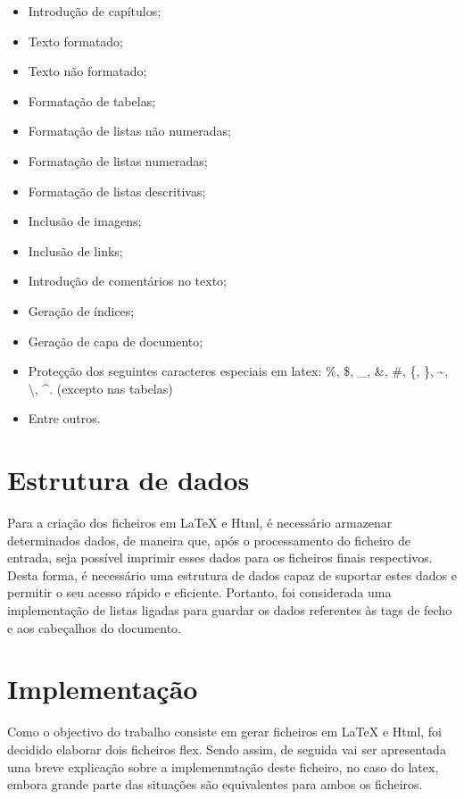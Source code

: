 \documentclass[11pt,a4paper]{article}
\begin{document}
\begin{itemize}
    \item Introdução de capítulos;
    \item Texto formatado;
    \item Texto não formatado;
    \item Formatação de tabelas;
    \item Formatação de listas não numeradas;
    \item Formatação de listas numeradas;
    \item Formatação de listas descritivas;
    \item Inclusão de imagens;
    \item Inclusão de links;
    \item Introdução de comentários no texto;
    \item Geração de índices;
    \item Geração de capa de documento;
    \item Proteçção dos seguintes caracteres especiais em latex: \%, \$, \_, \&, \#, \{, \}, \textasciitilde , \textbackslash , \textasciicircum . (excepto nas tabelas) 
    \item Entre outros.
\end{itemize}


\section{Estrutura de dados}
Para a criação dos ficheiros em LaTeX e Html, é necessário armazenar determinados dados, de maneira que, após o processamento do ficheiro de entrada, seja possível imprimir esses dados para os ficheiros finais  respectivos. Desta forma, é necessário uma estrutura de dados capaz de suportar estes dados e permitir o seu acesso rápido e eficiente. Portanto, foi considerada uma implementação de listas ligadas para guardar os dados referentes às tags de fecho e aos cabeçalhos do documento. 

\section{Implementação}
Como o objectivo do trabalho consiste em gerar ficheiros em LaTeX e Html, foi decidido elaborar dois ficheiros flex. Sendo assim, de seguida vai ser apresentada uma breve explicação sobre a implemenmtação deste ficheiro, no caso do latex, embora grande parte das situações são equivalentes para ambos os ficheiros.
\end{document}
